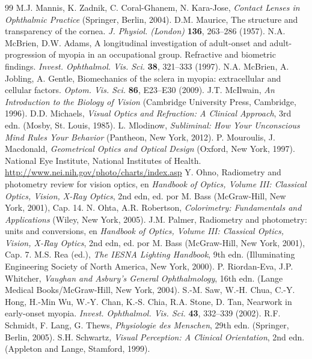 \documentclass[12pt]{book}
\begin{document}
\begin{thebibliography}{99}
 M.J. Mannis, K. Zadnik, C. Coral-Ghanem, N. Kara-Jose, \textit{Contact Lenses in Ophthalmic Practice} (Springer, Berlin, 2004).
 D.M. Maurice, The structure and transparency of the cornea. \textit{J. Physiol. (London)} \textbf{136}, 263--286 (1957).
 N.A. McBrien, D.W. Adams, A longitudinal investigation of adult-onset and adult-progression of myopia in an occupational group. Refractive and biometric findings. \textit{Invest. Ophthalmol. Vis. Sci.} \textbf{38}, 321--333 (1997).
 N.A. McBrien, A. Jobling, A. Gentle, Biomechanics of the sclera in myopia: extracellular and cellular factors. \textit{Optom. Vis. Sci.} \textbf{86}, E23--E30 (2009).
 J.T. McIlwain, \textit{An Introduction to the Biology of Vision} (Cambridge University Press, Cambridge, 1996).
 D.D. Michaels, \textit{Visual Optics and Refraction: A Clinical Approach}, 3rd edn. (Mosby, St. Louis, 1985).
 L. Mlodinow, \textit{Subliminal: How Your Unconscious Mind Rules Your Behavior} (Pantheon, New York, 2012).
 P. Mouroulis, J. Macdonald, \textit{Geometrical Optics and Optical Design} (Oxford, New York, 1997).
 National Eye Institute, National Institutes of Health. \url{http://www.nei.nih.gov/photo/charts/index.asp}
 Y. Ohno, Radiometry and photometry review for vision optics, en \textit{Handbook of Optics, Volume III: Classical Optics, Vision, X-Ray Optics}, 2nd edn, ed. por M. Bass (McGraw-Hill, New York, 2001), Cap. 14.
 N. Ohta, A.R. Robertson, \textit{Colorimetry: Fundamentals and Applications} (Wiley, New York, 2005).
 J.M. Palmer, Radiometry and photometry: units and conversions, en \textit{Handbook of Optics, Volume III: Classical Optics, Vision, X-Ray Optics}, 2nd edn, ed. por M. Bass (McGraw-Hill, New York, 2001), Cap. 7.
 M.S. Rea (ed.), \textit{The IESNA Lighting Handbook}, 9th edn. (Illuminating Engineering Society of North America, New York, 2000).
 P. Riordan-Eva, J.P. Whitcher, \textit{Vaughan and Asbury's General Ophthalmology}, 16th edn. (Lange Medical Books/McGraw-Hill, New York, 2004).
 S.-M. Saw, W.-H. Chua, C.-Y. Hong, H.-Min Wu, W.-Y. Chan, K.-S. Chia, R.A. Stone, D. Tan, Nearwork in early-onset myopia. \textit{Invest. Ophthalmol. Vis. Sci.} \textbf{43}, 332--339 (2002).
 R.F. Schmidt, F. Lang, G. Thews, \textit{Physiologie des Menschen}, 29th edn. (Springer, Berlin, 2005).
 S.H. Schwartz, \textit{Visual Perception: A Clinical Orientation}, 2nd edn. (Appleton and Lange, Stamford, 1999).

\end{thebibliography}
\end{document}
